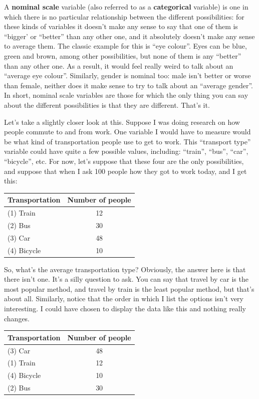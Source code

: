 \documentclass[
]{book}
\begin{document}
A \textbf{nominal scale} variable (also referred to as a \textbf{categorical} variable) is one in which there is no particular relationship between the different possibilities: for these kinds of variables it doesn't make any sense to say that one of them is ``bigger' or ``better'' than any other one, and it absolutely doesn't make any sense to average them. The classic example for this is ``eye colour''. Eyes can be blue, green and brown, among other possibilities, but none of them is any ``better'' than any other one. As a result, it would feel really weird to talk about an ``average eye colour''. Similarly, gender is nominal too: male isn't better or worse than female, neither does it make sense to try to talk about an ``average gender''. In short, nominal scale variables are those for which the only thing you can say about the different possibilities is that they are different. That's it.

Let's take a slightly closer look at this. Suppose I was doing research on how people commute to and from work. One variable I would have to measure would be what kind of transportation people use to get to work. This ``transport type'' variable could have quite a few possible values, including: ``train'', ``bus'', ``car'', ``bicycle'', etc. For now, let's suppose that these four are the only possibilities, and suppose that when I ask 100 people how they got to work today, and I get this:

\begin{longtable}[]{@{}lc@{}}
\toprule
Transportation & Number of people\tabularnewline
\midrule
\endhead
(1) Train & 12\tabularnewline
(2) Bus & 30\tabularnewline
(3) Car & 48\tabularnewline
(4) Bicycle & 10\tabularnewline
\bottomrule
\end{longtable}

So, what's the average transportation type? Obviously, the answer here is that there isn't one. It's a silly question to ask. You can say that travel by car is the most popular method, and travel by train is the least popular method, but that's about all. Similarly, notice that the order in which I list the options isn't very interesting. I could have chosen to display the data like this and nothing really changes.

\begin{longtable}[]{@{}lc@{}}
\toprule
Transportation & Number of people\tabularnewline
\midrule
\endhead
(3) Car & 48\tabularnewline
(1) Train & 12\tabularnewline
(4) Bicycle & 10\tabularnewline
(2) Bus & 30\tabularnewline
\bottomrule
\end{longtable}
\end{document}
